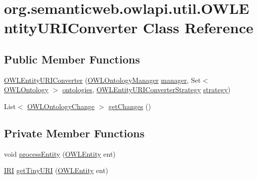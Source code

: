 \hypertarget{classorg_1_1semanticweb_1_1owlapi_1_1util_1_1_o_w_l_entity_u_r_i_converter}{\section{org.\-semanticweb.\-owlapi.\-util.\-O\-W\-L\-Entity\-U\-R\-I\-Converter Class Reference}
\label{classorg_1_1semanticweb_1_1owlapi_1_1util_1_1_o_w_l_entity_u_r_i_converter}
}
\subsection*{Public Member Functions}
\begin{DoxyCompactItemize}
\item 
\hyperlink{classorg_1_1semanticweb_1_1owlapi_1_1util_1_1_o_w_l_entity_u_r_i_converter_a1ffaef9a27044ae10b7dbeaad2c3e32f}{O\-W\-L\-Entity\-U\-R\-I\-Converter} (\hyperlink{interfaceorg_1_1semanticweb_1_1owlapi_1_1model_1_1_o_w_l_ontology_manager}{O\-W\-L\-Ontology\-Manager} \hyperlink{classorg_1_1semanticweb_1_1owlapi_1_1util_1_1_o_w_l_entity_u_r_i_converter_aabf6f91659c11def9dad9c64dfe1795e}{manager}, Set$<$ \hyperlink{interfaceorg_1_1semanticweb_1_1owlapi_1_1model_1_1_o_w_l_ontology}{O\-W\-L\-Ontology} $>$ \hyperlink{classorg_1_1semanticweb_1_1owlapi_1_1util_1_1_o_w_l_entity_u_r_i_converter_a0094d34fbdc7761c4e281c3cd6d7b95c}{ontologies}, \hyperlink{interfaceorg_1_1semanticweb_1_1owlapi_1_1util_1_1_o_w_l_entity_u_r_i_converter_strategy}{O\-W\-L\-Entity\-U\-R\-I\-Converter\-Strategy} \hyperlink{classorg_1_1semanticweb_1_1owlapi_1_1util_1_1_o_w_l_entity_u_r_i_converter_a1d9858051f6393dcac39a57d1e91e685}{strategy})
\item 
List$<$ \hyperlink{classorg_1_1semanticweb_1_1owlapi_1_1model_1_1_o_w_l_ontology_change}{O\-W\-L\-Ontology\-Change} $>$ \hyperlink{classorg_1_1semanticweb_1_1owlapi_1_1util_1_1_o_w_l_entity_u_r_i_converter_a1933ffcfde0e7983911b4ecb08954022}{get\-Changes} ()
\end{DoxyCompactItemize}
\subsection*{Private Member Functions}
\begin{DoxyCompactItemize}
\item 
void \hyperlink{classorg_1_1semanticweb_1_1owlapi_1_1util_1_1_o_w_l_entity_u_r_i_converter_a40ff0970f47eb99f03da93ed5d5ef294}{process\-Entity} (\hyperlink{interfaceorg_1_1semanticweb_1_1owlapi_1_1model_1_1_o_w_l_entity}{O\-W\-L\-Entity} ent)
\item 
\hyperlink{classorg_1_1semanticweb_1_1owlapi_1_1model_1_1_i_r_i}{I\-R\-I} \hyperlink{classorg_1_1semanticweb_1_1owlapi_1_1util_1_1_o_w_l_entity_u_r_i_converter_af06711d13e6ea85784311bc5d75f207a}{get\-Tiny\-U\-R\-I} (\hyperlink{interfaceorg_1_1semanticweb_1_1owlapi_1_1model_1_1_o_w_l_entity}{O\-W\-L\-Entity} ent)
\end{DoxyCompactItemize}
